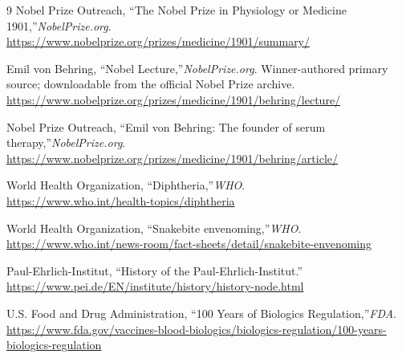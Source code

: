\begin{thebibliography}{9}
Nobel Prize Outreach, ``The Nobel Prize in Physiology or Medicine 1901,''\emph{NobelPrize.org}.\\
\url{https://www.nobelprize.org/prizes/medicine/1901/summary/}

Emil von Behring, ``Nobel Lecture,''\emph{NobelPrize.org}. Winner-authored primary source; downloadable from the official Nobel Prize archive.\\
\url{https://www.nobelprize.org/prizes/medicine/1901/behring/lecture/}

Nobel Prize Outreach, ``Emil von Behring: The founder of serum therapy,''\emph{NobelPrize.org}.\\
\url{https://www.nobelprize.org/prizes/medicine/1901/behring/article/}

World Health Organization, ``Diphtheria,''\emph{WHO}.\\
\url{https://www.who.int/health-topics/diphtheria}

World Health Organization, ``Snakebite envenoming,''\emph{WHO}.\\
\url{https://www.who.int/news-room/fact-sheets/detail/snakebite-envenoming}

Paul-Ehrlich-Institut, ``History of the Paul-Ehrlich-Institut.''\\
\url{https://www.pei.de/EN/institute/history/history-node.html}

U.S. Food and Drug Administration, ``100 Years of Biologics Regulation,''\emph{FDA}.\\
\url{https://www.fda.gov/vaccines-blood-biologics/biologics-regulation/100-years-biologics-regulation}
\end{thebibliography}
